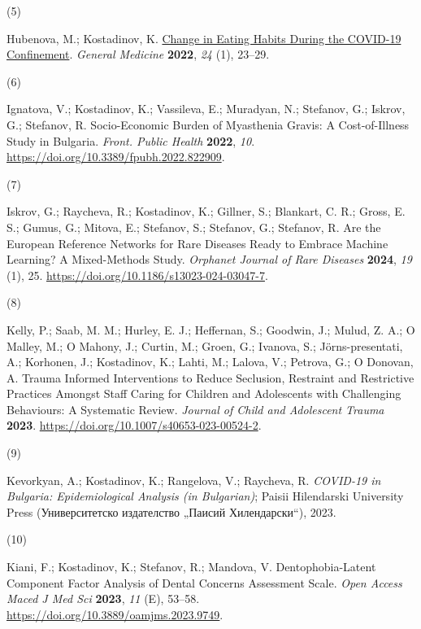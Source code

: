 \documentclass[
  12pt,
  letterpaper,
  DIV=11,
  numbers=noendperiod]{scrartcl}
\newlength{\cslhangindent}
\newlength{\csllabelwidth}
\newenvironment{CSLReferences}[2] %
 {\begin{list}{}{%
  \setlength{\itemindent}{0pt}
  \setlength{\leftmargin}{0pt}
  \setlength{\parsep}{0pt}
  \ifodd #1
   \setlength{\leftmargin}{\cslhangindent}
   \setlength{\itemindent}{-1\cslhangindent}
  \fi
  \setlength{\itemsep}{#2\baselineskip}}}
 {\end{list}}
\newcommand{\CSLLeftMargin}[1]{\parbox[t]{\csllabelwidth}{\strut#1\strut}}
\newcommand{\CSLRightInline}[1]{\parbox[t]{\linewidth - \csllabelwidth}{\strut#1\strut}}
\begin{document}
\begin{CSLReferences}{0}{0}
\CSLLeftMargin{(5) }%
\CSLRightInline{Hubenova, M.; Kostadinov, K.
\href{https://www.scopus.com/inward/record.uri?eid=2-s2.0-85131335656&partnerID=40&md5=960321f2fcf677479ecd9d43d8f6d6d0}{Change
in Eating Habits During the COVID-19 Confinement}. \emph{General
Medicine} \textbf{2022}, \emph{24} (1), 23--29.}

\CSLLeftMargin{(6) }%
\CSLRightInline{Ignatova, V.; Kostadinov, K.; Vassileva, E.; Muradyan,
N.; Stefanov, G.; Iskrov, G.; Stefanov, R. Socio-Economic Burden of
Myasthenia Gravis: A Cost-of-Illness Study in Bulgaria. \emph{Front.
Public Health} \textbf{2022}, \emph{10}.
\url{https://doi.org/10.3389/fpubh.2022.822909}.}

\CSLLeftMargin{(7) }%
\CSLRightInline{Iskrov, G.; Raycheva, R.; Kostadinov, K.; Gillner, S.;
Blankart, C. R.; Gross, E. S.; Gumus, G.; Mitova, E.; Stefanov, S.;
Stefanov, G.; Stefanov, R. Are the European Reference Networks for Rare
Diseases Ready to Embrace Machine Learning? A Mixed-Methods Study.
\emph{Orphanet Journal of Rare Diseases} \textbf{2024}, \emph{19} (1),
25. \url{https://doi.org/10.1186/s13023-024-03047-7}.}

\CSLLeftMargin{(8) }%
\CSLRightInline{Kelly, P.; Saab, M. M.; Hurley, E. J.; Heffernan, S.;
Goodwin, J.; Mulud, Z. A.; O Malley, M.; O Mahony, J.; Curtin, M.;
Groen, G.; Ivanova, S.; Jörns-presentati, A.; Korhonen, J.; Kostadinov,
K.; Lahti, M.; Lalova, V.; Petrova, G.; O Donovan, A. Trauma Informed
Interventions to Reduce Seclusion, Restraint and Restrictive Practices
Amongst Staff Caring for Children and Adolescents with Challenging
Behaviours: A Systematic Review. \emph{Journal of Child and Adolescent
Trauma} \textbf{2023}.
\url{https://doi.org/10.1007/s40653-023-00524-2}.}

\CSLLeftMargin{(9) }%
\CSLRightInline{Kevorkyan, A.; Kostadinov, K.; Rangelova, V.; Raycheva,
R. \emph{COVID-19 in Bulgaria: Epidemiological Analysis (in Bulgarian)};
Paisii Hilendarski University Press (Университетско издателство „Паисий
Хилендарски``), 2023.}

\CSLLeftMargin{(10) }%
\CSLRightInline{Kiani, F.; Kostadinov, K.; Stefanov, R.; Mandova, V.
Dentophobia-Latent Component Factor Analysis of Dental Concerns
Assessment Scale. \emph{Open Access Maced J Med Sci} \textbf{2023},
\emph{11} (E), 53--58. \url{https://doi.org/10.3889/oamjms.2023.9749}.}


\end{CSLReferences}
\end{document}
